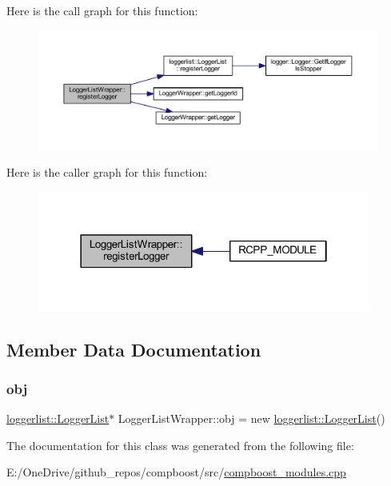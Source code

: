 Here is the call graph for this function\+:\nopagebreak
\begin{figure}[H]
\begin{center}
\leavevmode
\includegraphics[width=350pt]{class_logger_list_wrapper_a428932ced69ba53f256b832a94563524_cgraph}
\end{center}
\end{figure}
Here is the caller graph for this function\+:\nopagebreak
\begin{figure}[H]
\begin{center}
\leavevmode
\includegraphics[width=310pt]{class_logger_list_wrapper_a428932ced69ba53f256b832a94563524_icgraph}
\end{center}
\end{figure}


\subsection{Member Data Documentation}
\mbox{\label{class_logger_list_wrapper_a399fe67a339604a00e2b7654a4aba97c}} 
\subsubsection{\texorpdfstring{obj}{obj}}
{\footnotesize\ttfamily \mbox{\hyperlink{classloggerlist_1_1_logger_list}{loggerlist\+::\+Logger\+List}}$\ast$ Logger\+List\+Wrapper\+::obj = new \mbox{\hyperlink{classloggerlist_1_1_logger_list}{loggerlist\+::\+Logger\+List}}()\hspace{0.3cm}{\ttfamily [private]}}



The documentation for this class was generated from the following file\+:\begin{DoxyCompactItemize}
\item 
E\+:/\+One\+Drive/github\+\_\+repos/compboost/src/\mbox{\hyperlink{compboost__modules_8cpp}{compboost\+\_\+modules.\+cpp}}\end{DoxyCompactItemize}
